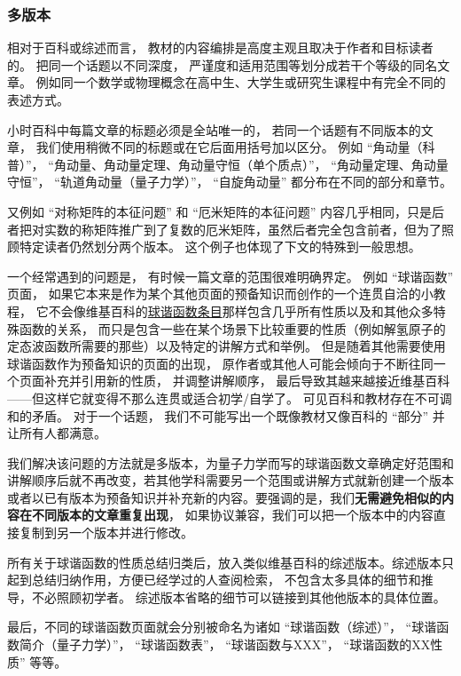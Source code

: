 \subsubsection{多版本}
相对于百科或综述而言， 教材的内容编排是高度主观且取决于作者和目标读者的。 把同一个话题以不同深度， 严谨度和适用范围等划分成若干个等级的同名文章。 例如同一个数学或物理概念在高中生、大学生或研究生课程中有完全不同的表述方式。

小时百科中每篇文章的标题必须是全站唯一的， 若同一个话题有不同版本的文章， 我们使用稍微不同的标题或在它后面用括号加以区分。 例如 “角动量（科普）”， “角动量、角动量定理、角动量守恒（单个质点）”， “角动量定理、角动量守恒”， “轨道角动量（量子力学）”， “自旋角动量” 都分布在不同的部分和章节。

又例如 “对称矩阵的本征问题” 和 “厄米矩阵的本征问题” 内容几乎相同，只是后者把对实数的称矩阵推广到了复数的厄米矩阵，虽然后者完全包含前者，但为了照顾特定读者仍然划分两个版本。 这个例子也体现了下文的特殊到一般思想。


一个经常遇到的问题是， 有时候一篇文章的范围很难明确界定。 例如 “球谐函数” 页面， 如果它本来是作为某个其他页面的预备知识而创作的一个连贯自洽的小教程， 它不会像维基百科的\href{https://en.wikipedia.org/wiki/Spherical_harmonics}{球谐函数条目}那样包含几乎所有性质以及和其他众多特殊函数的关系， 而只是包含一些在某个场景下比较重要的性质（例如解氢原子的定态波函数所需要的那些）以及特定的讲解方式和举例。 但是随着其他需要使用球谐函数作为预备知识的页面的出现， 原作者或其他人可能会倾向于不断往同一个页面补充并引用新的性质， 并调整讲解顺序， 最后导致其越来越接近维基百科——但这样它就变得不那么连贯或适合初学/自学了。 可见百科和教材存在不可调和的矛盾。 对于一个话题， 我们不可能写出一个既像教材又像百科的 “部分” 并让所有人都满意。

我们解决该问题的方法就是多版本，为量子力学而写的球谐函数文章确定好范围和讲解顺序后就不再改变，若其他学科需要另一个范围或讲解方式就新创建一个版本或者以已有版本为预备知识并补充新的内容。要强调的是，我们\textbf{无需避免相似的内容在不同版本的文章重复出现}， 如果协议兼容，我们可以把一个版本中的内容直接复制到另一个版本并进行修改。

所有关于球谐函数的性质总结归类后，放入类似维基百科的综述版本。综述版本只起到总结归纳作用，方便已经学过的人查阅检索， 不包含太多具体的细节和推导，不必照顾初学者。 综述版本省略的细节可以链接到其他他版本的具体位置。

最后，不同的球谐函数页面就会分别被命名为诸如 “球谐函数（综述）”， “球谐函数简介（量子力学）”， “球谐函数表”， “球谐函数与XXX”， “球谐函数的XX性质” 等等。


